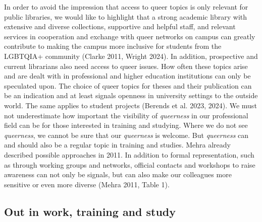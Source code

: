 \documentclass[a4paper,
fontsize=11pt,
oneside,
numbers=noperiodatend,
parskip=half-,
bibliography=totoc,
final
]{scrartcl}
\begin{document}
In order to avoid the impression that access to queer topics is only
relevant for public libraries, we would like to highlight that a strong
academic library with extensive and diverse collections, supportive and
helpful staff, and relevant services in cooperation and exchange with
queer networks on campus can greatly contribute to making the campus
more inclusive for students from the LGBTQIA+ community (Clarke 2011,
Wright 2024). In addition, prospective and current librarians also need
access to queer issues. How often these topics arise and are dealt with
in professional and higher education institutions can only be speculated
upon. The choice of queer topics for theses and their publication can be
an indication and at least signals openness in university settings to
the outside world. The same applies to student projects (Berends et al.
2023, 2024). We must not underestimate how important the visibility of
\emph{queerness} in our professional field can be for those interested
in training and studying. Where we do not see \emph{queerness}, we
cannot be sure that our \emph{queerness} is welcome. But
\emph{queerness} can and should also be a regular topic in training and
studies. Mehra already described possible approaches in 2011. In
addition to formal representation, such as through working groups and
networks, official contacts and workshops to raise awareness can not
only be signals, but can also make our colleagues more sensitive or even
more diverse (Mehra 2011, Table 1).

\hypertarget{out-in-work-training-and-study}{%
\subsection{Out in work, training and
study}\label{out-in-work-training-and-study}}
\end{document}
